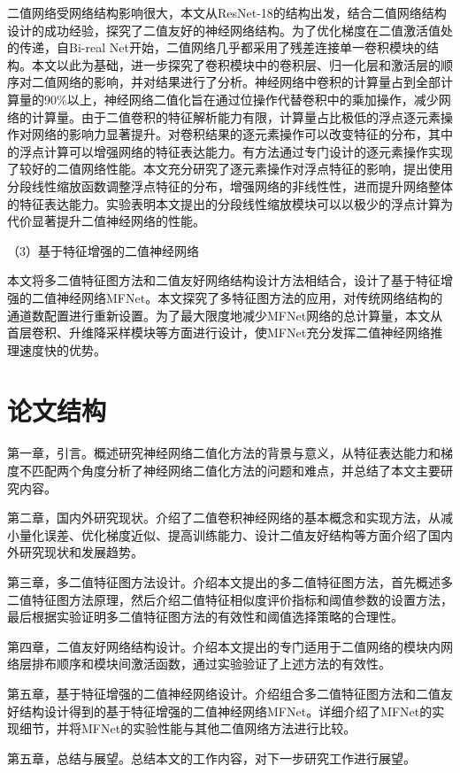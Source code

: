 二值网络受网络结构影响很大，本文从ResNet-18\cite{resnet}的结构出发，结合二值网络结构设计的成功经验，探究了二值友好的神经网络结构。为了优化梯度在二值激活值处的传递，自Bi-real Net\cite{birealnet}开始，二值网络几乎都采用了残差连接单一卷积模块的结构。本文以此为基础，进一步探究了卷积模块中的卷积层、归一化层和激活层的顺序对二值网络的影响，并对结果进行了分析。神经网络中卷积的计算量占到全部计算量的90\%以上，神经网络二值化旨在通过位操作代替卷积中的乘加操作，减少网络的计算量。由于二值卷积的特征解析能力有限，计算量占比极低的浮点逐元素操作对网络的影响力显著提升。对卷积结果的逐元素操作可以改变特征的分布，其中的浮点计算可以增强网络的特征表达能力。有方法通过专门设计的逐元素操作实现了较好的二值网络性能\cite{reactnet}。本文充分研究了逐元素操作对浮点特征的影响，提出使用分段线性缩放函数调整浮点特征的分布，增强网络的非线性性，进而提升网络整体的特征表达能力。实验表明本文提出的分段线性缩放模块可以以极少的浮点计算为代价显著提升二值神经网络的性能。

（3）基于特征增强的二值神经网络

本文将多二值特征图方法和二值友好网络结构设计方法相结合，设计了基于特征增强的二值神经网络MFNet。本文探究了多特征图方法的应用，对传统网络结构的通道数配置进行重新设置。为了最大限度地减少MFNet网络的总计算量，本文从首层卷积、升维降采样模块等方面进行设计，使MFNet充分发挥二值神经网络推理速度快的优势。

\section{论文结构}

第一章，引言。概述研究神经网络二值化方法的背景与意义，从特征表达能力和梯度不匹配两个角度分析了神经网络二值化方法的问题和难点，并总结了本文主要研究内容。

第二章，国内外研究现状。介绍了二值卷积神经网络的基本概念和实现方法，从减小量化误差、优化梯度近似、提高训练能力、设计二值友好结构等方面介绍了国内外研究现状和发展趋势。

第三章，多二值特征图方法设计。介绍本文提出的多二值特征图方法，首先概述多二值特征图方法原理，然后介绍二值特征相似度评价指标和阈值参数的设置方法，最后根据实验证明多二值特征图方法的有效性和阈值选择策略的合理性。

第四章，二值友好网络结构设计。介绍本文提出的专门适用于二值网络的模块内网络层排布顺序和模块间激活函数，通过实验验证了上述方法的有效性。

第五章，基于特征增强的二值神经网络设计。介绍组合多二值特征图方法和二值友好结构设计得到的基于特征增强的二值神经网络MFNet。详细介绍了MFNet的实现细节，并将MFNet的实验性能与其他二值网络方法进行比较。

第五章，总结与展望。总结本文的工作内容，对下一步研究工作进行展望。